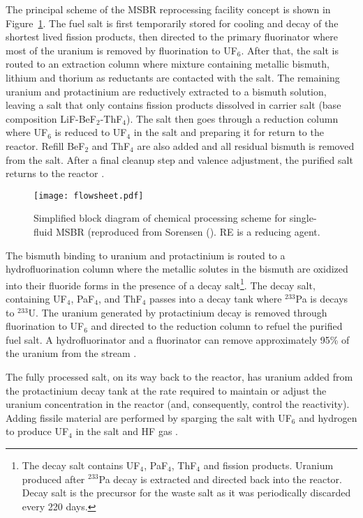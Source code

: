 The principal scheme of the \gls{MSBR} reprocessing facility concept is shown in Figure~\ref{fig:material_flow}. The fuel salt is first temporarily stored for cooling and decay of the shortest lived fission products, then directed to the primary fluorinator where most of the uranium is removed by fluorination to UF$_6$. After that, the salt is routed to an extraction column where mixture containing metallic bismuth, lithium and thorium as reductants are contacted with the salt. The remaining uranium and protactinium are reductively extracted to a bismuth solution, leaving a salt that only contains fission products dissolved in carrier salt (base composition LiF-BeF$_2$-ThF$_4$). The salt then goes through a reduction column where UF$_6$ is reduced to UF$_4$ in the salt and preparing it for return to the reactor. Refill BeF$_2$ and ThF$_4$ are also added and all residual bismuth is removed from the salt. After a final cleanup step and valence adjustment, the purified salt returns to the reactor \cite{carter_design_1972,sorensen_one-fluid_2006}.
\begin{figure}[htp!] %
  \centering
  \texttt{[image: flowsheet.pdf]}
  \caption{Simplified block diagram of chemical processing scheme for single-fluid \gls{MSBR} (reproduced 
  from Sorensen (\cite{sorensen_one-fluid_2006}). RE is a reducing agent.}
  \label{fig:material_flow}
\end{figure}

The bismuth binding to uranium and protactinium is routed to a hydrofluorination column where the metallic solutes in the bismuth are oxidized into their fluoride forms in the presence of a decay salt\footnote{The decay salt contains UF$_4$, PaF$_4$, ThF$_4$ and fission products. Uranium produced after $^{233}$Pa decay is extracted and directed back into the reactor. Decay salt is the precursor for the waste salt as it was periodically discarded every 220 days.}. The decay salt, containing UF$_4$, PaF$_4$, and ThF$_4$ passes into a decay tank where $^{233}$Pa is decays to $^{233}$U. The uranium generated by protactinium decay is removed through fluorination to UF$_6$ and directed to the reduction column to refuel the purified fuel salt. A hydrofluorinator and a fluorinator can remove approximately 95\% of the uranium from the stream 
\cite{robertson_conceptual_1971}.

The fully processed salt, on its way back to the reactor, has uranium added from the protactinium decay tank at the rate required to maintain or adjust the uranium concentration in the reactor (and, consequently, control the reactivity). Adding fissile material are performed by sparging the salt with UF$_6$ and hydrogen to produce UF$_4$ in the salt and HF gas \cite{robertson_conceptual_1971}.

